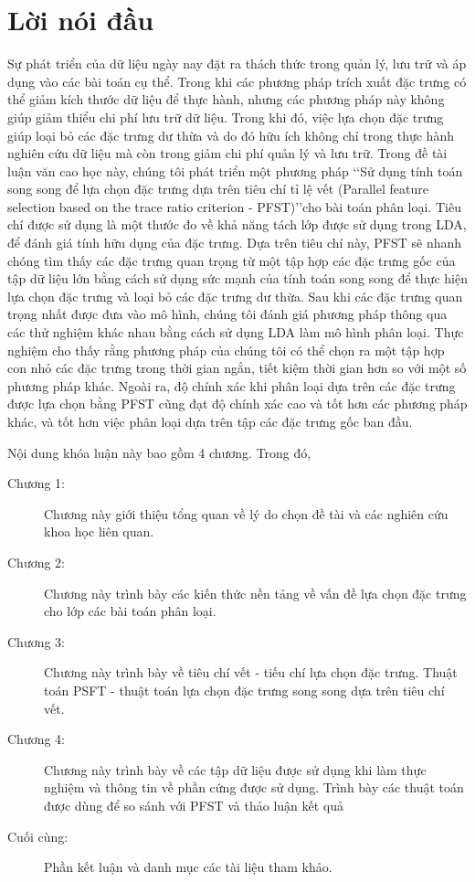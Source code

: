 \chapter*{Lời nói đầu}

Sự phát triển của dữ liệu ngày nay đặt ra thách thức trong quản lý, lưu trữ và áp dụng vào các bài toán cụ thể. Trong khi các phương pháp trích xuất đặc trưng có thể giảm kích thước dữ liệu để thực hành, nhưng các phương pháp này không giúp giảm thiểu chi phí lưu trữ dữ liệu. Trong khi đó, việc lựa chọn đặc trưng giúp loại bỏ các đặc trưng dư thừa và do đó hữu ích không chỉ trong thực hành nghiên cứu dữ liệu mà còn trong giảm chi phí quản lý và lưu trữ.  Trong đề tài luận văn cao học này, chúng tôi phát triển một phương pháp \lq\lq Sử dụng tính toán song song để lựa chọn đặc trưng dựa trên tiêu chí tỉ lệ vết (Parallel feature selection based on the trace ratio criterion - PFST)\rq\rq cho bài toán phân loại. Tiêu chí được sử dụng là một thước đo về khả năng tách lớp được sử dụng trong LDA, để đánh giá tính hữu dụng của đặc trưng. Dựa trên tiêu chí này, PFST sẽ nhanh chóng tìm thấy các đặc trưng quan trọng từ một tập hợp các đặc trưng gốc của tập dữ liệu lớn bằng cách sử dụng sức mạnh của tính toán song song để thực hiện lựa chọn đặc trưng và loại bỏ các đặc trưng dư thừa. Sau khi các đặc trưng quan trọng nhất được đưa vào mô hình, chúng tôi đánh giá phương pháp thông qua các thử nghiệm khác nhau bằng cách sử dụng LDA làm mô hình phân loại. Thực nghiệm cho thấy rằng phương pháp của chúng tôi có thể chọn ra một tập hợp con nhỏ các đặc trưng trong thời gian ngắn, tiết kiệm thời gian hơn so với một số phương pháp khác. Ngoài ra, độ chính xác khi phân loại dựa trên các đặc trưng được lựa chọn bằng PFST cũng đạt độ chính xác cao và tốt hơn các phương pháp khác, và tốt hơn việc phân loại dựa trên tập các đặc trưng gốc ban đầu.

Nội dung khóa luận này bao gồm 4 chương. Trong đó,
\begin{description}
	\item[Chương 1:] Chương này giới thiệu tổng quan về lý do chọn đề tài và các nghiên cứu khoa học liên quan.
	\item[Chương 2:] Chương này trình bày các kiến thức nền tảng về vấn đề lựa chọn đặc trưng cho lớp các bài toán phân loại.
	\item[Chương 3:] Chương này trình bày về tiêu chí vết - tiếu chí lựa chọn đặc trưng. Thuật toán PSFT - thuật toán lựa chọn đặc trưng song song dựa trên tiêu chí vết.
	\item[Chương 4:] Chương này trình bày về các tập dữ liệu được sử dụng khi làm thực nghiệm và thông tin về phần cứng được sử dụng. Trình bày các thuật toán được dùng để so sánh với PFST và thảo luận kết quả
	\item[Cuối cùng:] Phần kết luận và danh mục các tài liệu tham khảo.
\end{description}

